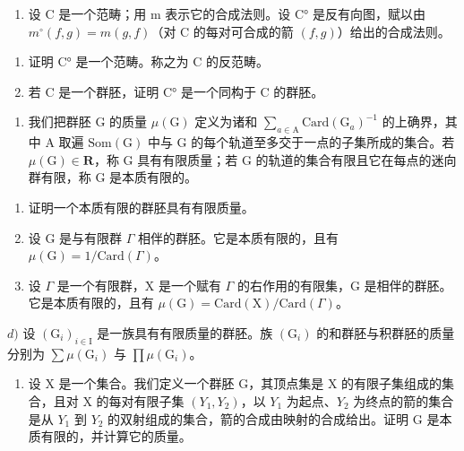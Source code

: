 \begin{enumerate}
\def\labelenumi{\arabic{enumi})}
\setcounter{enumi}{2}
\tightlist
\item
  设 C 是一个范畴；用 m 表示它的合成法则。设 C° 是反有向图，赋以由 \(m^{\circ}(f,g)=m(g,f)\)（对 C 的每对可合成的箭 \((f,g)\)）给出的合成法则。
\end{enumerate}

\begin{enumerate}
\def\labelenumi{\alph{enumi})}
\item
  证明 C° 是一个范畴。称之为 C 的反范畴。
\item
  若 C 是一个群胚，证明 C° 是一个同构于 C 的群胚。
\end{enumerate}

\begin{enumerate}
\def\labelenumi{\arabic{enumi})}
\setcounter{enumi}{3}
\tightlist
\item
  我们把群胚 G 的质量 \(\mu(\mathrm{G})\) 定义为诸和 \(\sum_{a\in\mathrm{A}}\mathrm{Card}(\mathrm{G}_{a})^{-1}\) 的上确界，其中 A 取遍 \(\mathrm{Som}(\mathrm{G})\) 中与 G 的每个轨道至多交于一点的子集所成的集合。若 \(\mu(\mathrm{G})\in\mathbf{R}\)，称 G 具有有限质量；若 G 的轨道的集合有限且它在每点的迷向群有限，称 G 是本质有限的。
\end{enumerate}

\begin{enumerate}
\def\labelenumi{\alph{enumi})}
\item
  证明一个本质有限的群胚具有有限质量。
\item
  设 G 是与有限群 \(\Gamma\) 相伴的群胚。它是本质有限的，且有 \(\mu(\mathrm{G}) = 1/\mathrm{Card}(\Gamma)\)。
\item
  设 \(\Gamma\) 是一个有限群，X 是一个赋有 \(\Gamma\) 的右作用的有限集，G 是相伴的群胚。它是本质有限的，且有 \(\mu(\mathrm{G}) = \mathrm{Card}(\mathrm{X}) / \mathrm{Card}(\Gamma)\)。
\end{enumerate}

\(d)\) 设 \((\mathrm{G}_i)_{i\in \mathrm{I}}\) 是一族具有有限质量的群胚。族 \((\mathrm{G}_i)\) 的和群胚与积群胚的质量分别为 \(\sum \mu (\mathrm{G}_i)\) 与 \(\prod \mu (\mathrm{G}_i)\)。

\begin{enumerate}
\def\labelenumi{\alph{enumi})}
\setcounter{enumi}{4}
\tightlist
\item
  设 X 是一个集合。我们定义一个群胚 G，其顶点集是 X 的有限子集组成的集合，且对 X 的每对有限子集 \((Y_{1}, Y_{2})\)，以 \(Y_{1}\) 为起点、\(Y_{2}\) 为终点的箭的集合是从 \(Y_{1}\) 到 \(Y_{2}\) 的双射组成的集合，箭的合成由映射的合成给出。证明 G 是本质有限的，并计算它的质量。
\end{enumerate}

